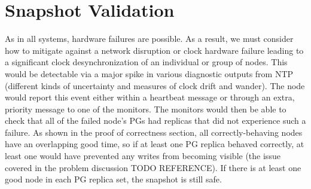 \section{Snapshot Validation}

As in all systems, hardware failures are possible. As a result, we
must consider how to mitigate against a network disruption or clock
hardware failure leading to a significant clock desynchronization of
an individual or group of nodes. This would be detectable via a major
spike in various diagnostic outputs from NTP (different kinds of
uncertainty and measures of clock drift and wander). %
The node would report this event either within a heartbeat message or
through an extra, priority message to one of the monitors. The
monitors would then be able to check that all of the failed node's PGs
had replicas that did not experience such a failure. As shown in the
proof of correctness section, all correctly-behaving nodes have an
overlapping good time, so if at least one PG replica behaved
correctly, at least one would have prevented any writes from becoming
visible (the issue covered in the problem discussion TODO
REFERENCE). If there is at least one good node in each PG replica set,
the snapshot is still safe.

